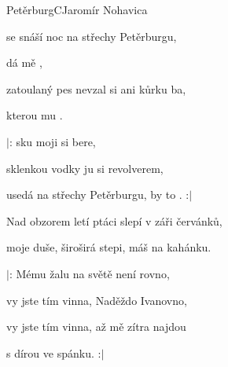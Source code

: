 \setcounter{page}{65}
\begin{song}{Petěrburg}{C}{Jaromír Nohavica}

\begin{SBVerse}

 se snáší noc na střechy Petěrburgu,

dá  mě ,

zatoulaný pes nevzal si ani kůrku ba,

kterou  mu .

\end{SBVerse}

\begin{SBChorus}

$|$: sku moji   si bere,

 sklenkou vodky ju si  revolverem,

 usedá na střechy Petěrburgu,  by to . :$|$

\end{SBChorus}

\begin{SBVerse}

Nad obzorem letí ptáci slepí v záři červánků,

moje duše, široširá stepi, máš na kahánku.

\end{SBVerse}

\begin{SBChorus}

$|$: Mému žalu na světě není rovno,

vy jste tím vinna, Naděždo Ivanovno,

vy jste tím vinna, až mě zítra najdou

s dírou ve spánku. :$|$

\end{SBChorus}

\end{song}

\clearpage
